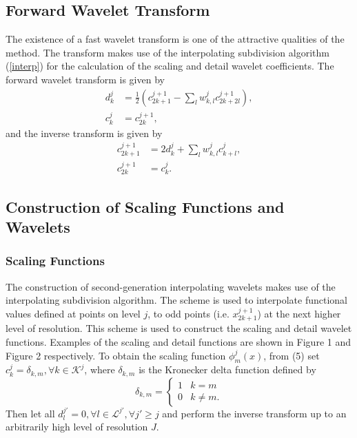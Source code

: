 \documentclass[11pt]{article}
\begin{document}
\subsection{Forward Wavelet Transform}
The existence of a fast wavelet transform is one of the attractive qualities of the method. The transform makes use of the 
interpolating subdivision algorithm (\ref{interp}) for the calculation of the scaling and detail wavelet coefficients. The forward wavelet transform is given by
\begin{equation}
	\begin{split}
		d_{k}^{j} &= \frac{1}{2} \left( c_{2k+1}^{j+1}-\sum_{l} w_{k,l}^{j} c_{2k+2l}^{j+1} \right), \\
		c_{k}^{j} &= c_{2k}^{j+1},
	\end{split}
\end{equation}
and the inverse transform is given by 
\begin{equation}
	\begin{split}
		c_{2k+1}^{j+1} &= 2 d_{k}^{j}  + \sum_{l} w_{k,l}^{j} c_{k+l}^{j}, \\
		c_{2k}^{j+1} &= c_{k}^{j}.
	\end{split}
\end{equation}

\subsection{Construction of Scaling Functions and Wavelets}

\subsubsection{Scaling Functions}
The construction of second-generation interpolating wavelets makes use of the interpolating subdivision algorithm. 
The scheme is used to interpolate functional values defined at points on level $j$, to odd points (i.e. $x_{2k+1}^{j+1}$) 
at the next higher level of resolution. This scheme is used to construct the scaling and detail wavelet functions. 
Examples of the scaling and detail functions are shown in Figure 1 and Figure 2 respectively.
To obtain the scaling function $\phi_{m}^{j}(x)$, from (5) set $c_{k}^{j}=\delta_{k,m}, \forall k \in \mathcal{K}^j$, where $\delta_{k,m}$ is the Kronecker delta function defined by
\[ \delta_{k,m} = \begin{cases} 
      1 & k=m \\
      0 & k \neq m.
   \end{cases}
\]
Then let all $d_{l}^{j'}=0, \forall l \in \mathcal{L}^{j'}, \forall j' \geq j$ and perform the inverse transform up to an arbitrarily high level of resolution $J$. 
\end{document}
